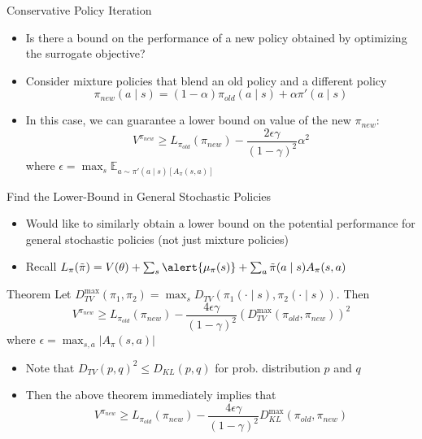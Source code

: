\documentclass[aspectratio=169]{../latex_main/tntbeamer}  %
\begin{document}
\begin{frame}[c]{Conservative Policy Iteration}
	
    \begin{itemize}
        \item Is there a bound on the performance of a new policy obtained by optimizing the surrogate objective?
        \item Consider mixture policies that blend an old policy and a different policy
        $$\pi_{new}(a \mid s) = (1 - \alpha) \pi_{old} (a \mid s) + \alpha \pi'(a \mid s) $$
        \item In this case, we can guarantee a lower bound on value of the new $\pi_{new}$:
        $$V^{\pi_{new}} \geq L_{\pi_{old}} (\pi_{new}) - \frac{2\epsilon\gamma}{(1- \gamma)^2} \alpha^2 $$
        where $\epsilon = \max_{s} \mathbb{E}_{a \sim \pi'(a \mid s) [A_\pi(s,a)]}$
    \end{itemize}

\end{frame}
\begin{frame}[c]{Find the Lower-Bound in General Stochastic Policies}
	
	 \vspace{-1.5em}
    \begin{itemize}
        \item Would like to similarly obtain a lower bound on the potential performance for general stochastic policies (not just mixture policies)
        \item Recall $ L_\pi(\Tilde{\pi}) = V(\theta) + \sum_{s} \alert{\mu_\pi (s)} + \sum_{a} \Tilde{\pi}(a \mid s) A_\pi(s,a)$ 
    \end{itemize}
    
    \begin{block}{Theorem}
    Let $D_{TV}^{\max} (\pi_1, \pi_2) = \max_{s} D_{TV}(\pi_1(\cdot \mid s), \pi_2(\cdot\mid s))$. Then
    $$V^{\pi_{new}} \geq L_{\pi_{old}} (\pi_{new}) - \frac{4\epsilon\gamma}{(1-\gamma)^2} (D_{TV}^{\max}(\pi_{old}, \pi_{new}))^2$$
    where $\epsilon = \max_{s,a}|A_\pi(s,a)|$
    \end{block}
    
    \begin{itemize}
        \item Note that $D_{TV}(p,q)^2 \leq D_{KL}(p,q)$ for prob. distribution $p$ and $q$
        \item Then the above theorem immediately implies that
        $$ V^{\pi_{new}} \geq  L_{\pi_{old}} (\pi_{new}) -  \frac{4\epsilon\gamma}{(1-\gamma)^2} D_{KL}^{\max}(\pi_{old}, \pi_{new}) $$
    \end{itemize}

\end{frame}
\end{document}
